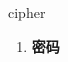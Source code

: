 
\begin{frame}
{\huge cipher}
\begin{center}
\begin{enumerate}\Large
  \item \textbf{密码}
\end{enumerate}
\end{center}
\end{frame}
